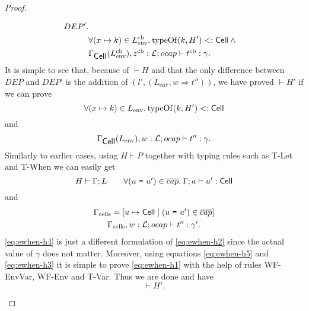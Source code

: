 \begin{proof}
\begin{description}
\begin{description}
\begin{description}
\begin{equation}
\begin{aligned}
                  DEP'. \\
                  &\forall (x \mapsto k) \in L^{\text{cb}}_{\text{env}}.\: \mbox{$\mathrm{typeOf}$}{(k, H')} <:
                  \mbox{$\mathsf{Cell}$} \: \land \\
                  &\mbox{$\Gamma_{\mbox{$\mathsf{Cell}$}{}}(L^{\text{cb}}_{\text{env}}), z^{\text{cb}}:
                  \mbox{$\mathcal{L}$};\mbox{$ocap$}\vdash t^{\text{cb}}:\gamma$} .
                \end{aligned}
              \end{equation}
              It is simple to see that, because of $\vdash H$ and that the only
              difference between $DEP$ and $DEP'$ is the addition of $(l',
              (L_{\text{env}}, w \Rightarrow t''))$, we have proved $\vdash H'$
              if we can prove
              \begin{equation} \label{eq:ewhen-h1}
                \forall (x \mapsto k) \in L_{\text{env}}.\: \mbox{$\mathrm{typeOf}$}{(k, H')} <:
                \mbox{$\mathsf{Cell}$}
              \end{equation}
              and
              \begin{equation} \label{eq:ewhen-h2}
                \mbox{$\Gamma_{\mbox{$\mathsf{Cell}$}{}}(L_{\text{env}}), w:
                \mbox{$\mathcal{L}$};\mbox{$ocap$}\vdash t'':\gamma$}.
              \end{equation}
              Similarly to earlier cases, using $H \vdash P$ together with
              typing rules such as {\sc T-Let} and {\sc T-When} we can easily
              get
              \begin{equation}\label{eq:ewhen-h3}
                H \vdash \Gamma; L \quad\quad \forall (\mbox{\mdseries$u$~\texttt{=}~$u'$}) \in
                \overline{cap}. \: \mbox{$\Gamma;a\vdash u':\mbox{$\mathsf{Cell}$}$} 
              \end{equation}
              and
              \begin{equation} \label{eq:ewhen-h4}
                \begin{gathered}
                  \Gamma_{\text{cells}} = [u \mapsto \mbox{$\mathsf{Cell}$} \mid (\mbox{\mdseries$u$~\texttt{=}~$u'$}) \in
                  \overline{cap}] \\
                  \mbox{$\Gamma_{\text{cells}}, w:
                  \mbox{$\mathcal{L}$};\mbox{$ocap$}\vdash t'':\gamma'$}.
                \end{gathered}
              \end{equation}
              \eqref{eq:ewhen-h4} is just a different formulation of
              \eqref{eq:ewhen-h2} since the actual value of $\gamma$ does not
              matter. Moreover, using equations \eqref{eq:ewhen-h5} and
              \eqref{eq:ewhen-h3} it is simple to prove \eqref{eq:ewhen-h1} with
              the help of rules {\sc WF-EnvVar}, {\sc WF-Env} and {\sc T-Var}.
              Thus we are done and have
              \begin{equation}
                \vdash H'.
              \end{equation}


\end{description}
\end{description}
\end{description}
\end{proof}
